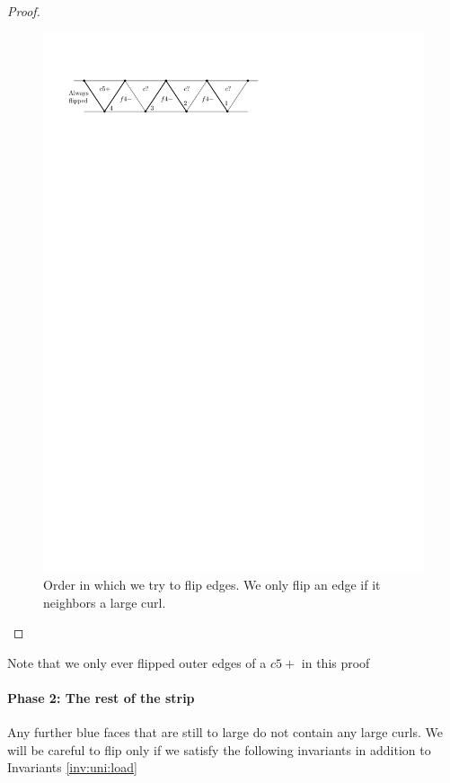 \begin{proof}
  \begin{figure}[h]
    \centering
    \includegraphics[scale=1]{unifiedAlgo/img/placeEdges}
    \caption{Order in which we try to flip edges. We only flip an edge if it neighbors a large curl.}
    \label{fig:uni:placeedges}
  \end{figure}

\end{proof}

  Note that we only ever flipped outer edges of a $c5+$ in this proof


\paragraph{Phase 2: The rest of the strip}

Any further blue faces that are still to large do not contain any large curls. We will be careful to flip only if we satisfy the following invariants in addition to Invariants \ref{inv:uni:load}


